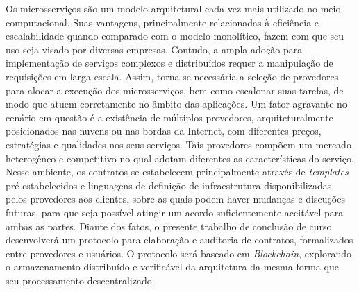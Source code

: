 

\bacharelado {}
\data {\today}




\newpage
\pagestyle{empty}

\maketitle



\noindent Os microsserviços são um modelo arquitetural cada vez mais utilizado no meio computacional. Suas vantagens, principalmente relacionadas à eficiência e escalabilidade quando comparado com o modelo monolítico, fazem com que seu uso seja visado por diversas empresas.
%
Contudo, a ampla adoção para implementação de serviços complexos e distribuídos requer a manipulação de requisições em larga escala.
%
Assim, torna-se necessária a seleção de provedores para alocar a execução dos microsserviços, bem como escalonar suas tarefas, de modo que atuem corretamente no âmbito das aplicações.
%
Um fator agravante no cenário em questão é a existência de múltiplos provedores, arquiteturalmente posicionados nas nuvens ou nas bordas da Internet, com diferentes preços, estratégias e qualidades nos seus serviços.
%
Tais provedores compõem um mercado heterogêneo e competitivo no qual adotam diferentes as características do serviço.
%
Nesse ambiente, os contratos se estabelecem principalmente através de \textit{templates} pré-estabelecidos e linguagens de definição de infraestrutura disponibilizadas pelos provedores aos clientes, sobre as quais podem haver mudanças e discuções futuras, para que seja possível atingir um acordo suficientemente aceitável para ambas as partes.
%
Diante dos fatos, o presente trabalho de conclusão de curso desenvolverá um protocolo para elaboração e auditoria de contratos, formalizados entre provedores e usuários.
%
O protocolo será baseado em \textit{Blockchain}, explorando o armazenamento distribuído e verificável da arquitetura da mesma forma que seu processamento descentralizado.

